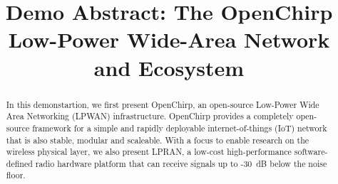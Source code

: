 \documentclass[conference]{IEEEtran}
\begin{document}
\title{Demo Abstract: The OpenChirp Low-Power Wide-Area Network and Ecosystem}
\author{
}


% 








\maketitle

\begin{abstract}

In this demonstartion, we first present OpenChirp, an open-source Low-Power
Wide Area Networking (LPWAN) infrastructure. OpenChirp provides a
completely open-source framework for a simple and rapidly deployable
internet-of-things (IoT) network that is also stable, modular and scaleable.
With a focus to enable research on the wireless physical layer, we also
present LPRAN, a low-cost high-performance software-defined radio hardware
platform that can receive signals up to -30~dB below the noise floor.

\end{abstract}
\end{document}

